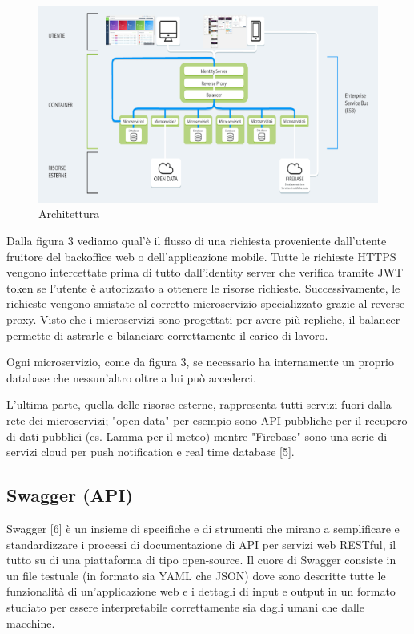 \begin{figure}[h!]
    \centering  
    \caption{Architettura}
    \includegraphics[scale=0.5]{img/cap1/architecture}
\end{figure}

Dalla figura 3 vediamo qual'è il flusso di una richiesta proveniente dall'utente fruitore del backoffice web o
dell'applicazione mobile.
Tutte le richieste HTTPS vengono intercettate prima di tutto dall'identity server che verifica tramite JWT token
se l'utente è autorizzato a ottenere le risorse richieste.
Successivamente, le richieste vengono smistate al corretto microservizio specializzato grazie al reverse proxy.
Visto che i microservizi sono progettati per avere più repliche, il balancer permette di astrarle e bilanciare correttamente
il carico di lavoro.

Ogni microservizio, come da figura 3, se necessario ha internamente un proprio database
che nessun'altro oltre a lui può accederci.

L'ultima parte, quella delle risorse esterne, rappresenta tutti servizi fuori dalla rete
dei microservizi; "open data" per esempio sono API pubbliche per il recupero di dati pubblici (es. Lamma per il meteo)
mentre "Firebase" sono una serie di servizi cloud per push notification e real time database [5].

\subsection{Swagger (API)}
Swagger [6] è un insieme di specifiche e di strumenti che mirano a semplificare e
standardizzare i processi di documentazione di API per servizi web RESTful, il tutto su
di una piattaforma di tipo open-source.
Il cuore di Swagger consiste in un file testuale (in formato sia YAML che JSON) dove
sono descritte tutte le funzionalità di un’applicazione web e i dettagli di input e output
in un formato studiato per essere interpretabile correttamente sia dagli umani che
dalle macchine.

